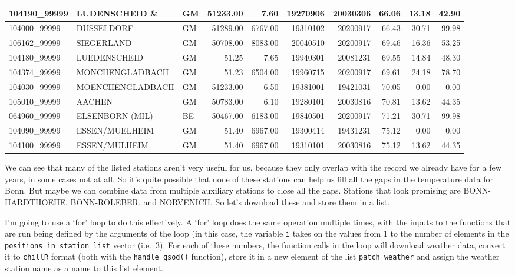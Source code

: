 \documentclass[
]{book}
\begin{document}
\begin{table}
\begin{tabular}[t]{l|l|l|r|r|r|r|r|r|r}
\hline
104190\_99999 & LUDENSCHEID       \& & GM & 51233.00 & 7.60 & 19270906 & 20030306 & 66.06 & 13.18 & 42.90\\
\hline
104000\_99999 & DUSSELDORF & GM & 51289.00 & 6767.00 & 19310102 & 20200917 & 66.43 & 30.71 & 99.98\\
\hline
106162\_99999 & SIEGERLAND & GM & 50708.00 & 8083.00 & 20040510 & 20200917 & 69.46 & 16.36 & 53.25\\
\hline
104180\_99999 & LUEDENSCHEID & GM & 51.25 & 7.65 & 19940301 & 20081231 & 69.55 & 14.84 & 48.30\\
\hline
104374\_99999 & MONCHENGLADBACH & GM & 51.23 & 6504.00 & 19960715 & 20200917 & 69.61 & 24.18 & 78.70\\
\hline
104030\_99999 & MOENCHENGLADBACH & GM & 51233.00 & 6.50 & 19381001 & 19421031 & 70.05 & 0.00 & 0.00\\
\hline
105010\_99999 & AACHEN & GM & 50783.00 & 6.10 & 19280101 & 20030816 & 70.81 & 13.62 & 44.35\\
\hline
064960\_99999 & ELSENBORN (MIL) & BE & 50467.00 & 6183.00 & 19840501 & 20200917 & 71.21 & 30.71 & 99.98\\
\hline
104090\_99999 & ESSEN/MUELHEIM & GM & 51.40 & 6967.00 & 19300414 & 19431231 & 75.12 & 0.00 & 0.00\\
\hline
104100\_99999 & ESSEN/MULHEIM & GM & 51.40 & 6967.00 & 19310101 & 20030816 & 75.12 & 13.62 & 44.35\\
\hline
\end{tabular}
\end{table}

We can see that many of the listed stations aren't very useful for us, because they only overlap with the record we already have for a few years, in some cases not at all. So it's quite possible that none of these stations can help us fill all the gaps in the temperature data for Bonn. But maybe we can combine data from multiple auxiliary stations to close all the gaps. Stations that look promising are BONN-HARDTHOEHE, BONN-ROLEBER, and NORVENICH. So let's download these and store them in a list.

I'm going to use a `for' loop to do this effectively. A `for' loop does the same operation multiple times, with the inputs to the functions that are run being defined by the arguments of the loop (in this case, the variable \texttt{i} takes on the values from 1 to the number of elements in the \texttt{positions\_in\_station\_list} vector (i.e.~3). For each of these numbers, the function calls in the loop will download weather data, convert it to \texttt{chillR} format (both with the \texttt{handle\_gsod()} function), store it in a new element of the list \texttt{patch\_weather} and assign the weather station name as a name to this list element.
\end{document}
